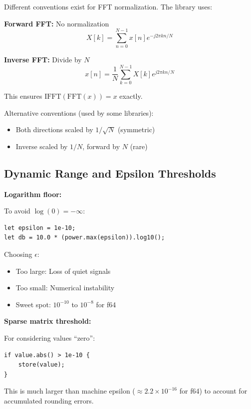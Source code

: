 Different conventions exist for FFT normalization. The library uses:

\textbf{Forward FFT:} No normalization
\begin{equation}
  X[k] = \sum_{n=0}^{N-1} x[n] e^{-j2\pi kn/N}
\end{equation}

\textbf{Inverse FFT:} Divide by $N$
\begin{equation}
  x[n] = \frac{1}{N}\sum_{k=0}^{N-1} X[k] e^{j2\pi kn/N}
\end{equation}

This ensures $\text{IFFT}(\text{FFT}(x)) = x$ exactly.

Alternative conventions (used by some libraries):
\begin{itemize}
  \item Both directions scaled by $1/\sqrt{N}$ (symmetric)
  \item Inverse scaled by $1/N$, forward by $N$ (rare)
\end{itemize}

\subsection{Dynamic Range and Epsilon Thresholds}

\textbf{Logarithm floor:}

To avoid $\log(0) = -\infty$:

\begin{lstlisting}[caption={Log floor with epsilon to avoid negative infinity}]
let epsilon = 1e-10;
let db = 10.0 * (power.max(epsilon)).log10();
\end{lstlisting}

Choosing $\epsilon$:
\begin{itemize}
  \item Too large: Loss of quiet signals
  \item Too small: Numerical instability
  \item Sweet spot: $10^{-10}$ to $10^{-8}$ for f64
\end{itemize}

\textbf{Sparse matrix threshold:}

For considering values ``zero'':

\begin{lstlisting}[caption={Epsilon threshold for sparse matrix storage}]
if value.abs() > 1e-10 {
    store(value);
}
\end{lstlisting}

This is much larger than machine epsilon ($\approx 2.2 \times
10^{-16}$ for f64) to account for accumulated rounding errors.


